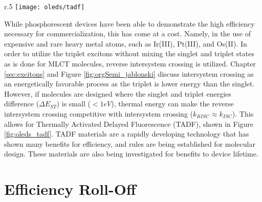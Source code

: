 \documentclass[../thesis.tex]{subfiles}
\begin{document}
\begin{wrapfigure}{r}{.5\textwidth}
\texttt{[image: oleds/tadf]}
\caption{Reverse intersystem crossing for TADF materials.  Figure taken from \textcite{Uoyama2012}.}
\label{fig:oleds_tadf}
\end{wrapfigure}

While phosphorescent devices have been able to demonstrate the high efficiency necessary for commercialization, this has come at a cost.
Namely, in the use of expensive and rare heavy metal atoms, such as Ir(III), Pt(III), and Os(II).\supercite{Adachi2001b}
In order to utilize the triplet excitons without mixing the singlet and triplet states as is done for MLCT molecules, reverse intersystem crossing is utilized.
Chapter \ref{sec:excitons} and Figure \ref{fig:orgSemi_jablonski} discuss intersystem crossing as an energetically favorable process as the triplet is lower energy than the singlet.
However, if molecules are designed where the singlet and triplet energies difference ($\Delta E_{ST}$) is small ($<1eV$), thermal energy can make the reverse intersystem crossing competitive with intersystem crossing ($k_{RISC}\approx k_{ISC}$).
This allows for Thermally Activated Delayed Fluorescence (TADF), shown in Figure \ref{fig:oleds_tadf}.\supercite{Zhang2012b,Zhang2014a,Uoyama2012}
TADF materials are a rapidly developing technology that has shown many benefits for efficiency, and rules are being established for molecular design.\supercite{Menke2016,Inoue2016,Li2013,Wang2015,Liu2015,Kim2015,Jankus2014,Lavie-Cambot2008,Zhang2012b,Endo2009,Yersin2014,Nasu2013,Uoyama2012,Zhang2012c,Hofbeck2015,Linfoot2014,Reineke2014a,Zhang2014a}
These materials are also being investigated for benefits to device lifetime.\supercite{Mehes2014,Cho2014}


\section{Efficiency Roll-Off}\label{sec:oleds_roll_off}
\end{document}
